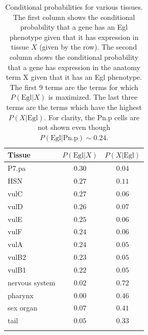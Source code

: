 \documentclass[10pt, onecolumn]{article}
\newcommand{\ra}[1]{\renewcommand{\arraystretch}{#1}}
\begin{document}
\begin{table}
  \renewcommand{\familydefault}{\sfdefault}\normalfont{}
  \centering{}
  \ra{1.3}
  \begin{tabular}{@{}lcc@{}}
  \toprule{}Tissue & $P(\text{Egl}| X)$ & $P(X|\text{Egl})$\\
  \bottomrule{}P7.pa & $0.30$ & $0.04$\\
  HSN & $0.27$ & $0.11$\\
  vulC & $0.27$ & $0.06$\\
  vulD & $0.26$ & $0.07$\\
  vulE & $0.25$ & $0.06$\\
  vulF & $0.24$ & $0.06$\\
  vulA & $0.24$ & $0.05$\\
  vulB2 & $0.23$ & $0.05$\\
  vulB1 & $0.22$ & $0.05$\\
  nervous system & $0.02$ & $0.72$ \\
  pharynx  & $0.00$ & $0.46$\\
  sex organ & $0.07$ & $0.41$\\
  tail & $0.05$ & $0.33$\\
  \bottomrule{}
  \end{tabular}
  \caption{Conditional probabilities for various tissues. The
  first column shows the conditional probability that a gene has an Egl
  phenotype given that it has expression in tissue $X$ (given by the row).
  The second column shows the conditional probability that a gene has expression
  in the anatomy term X given that it has an Egl phenotype. The first 9 terms
  are the terms for which $P(\text{Egl}|X)$ is maximized. The last three terms
  are the terms which have the highest $P(X|\text{Egl})$. For clarity, the Pn.p
  cells are not shown even though $P(\text{Egl}|\text{Pn.p})\sim 0.24$.}
\label{tab:cond_probs}
\end{table}
\end{document}
